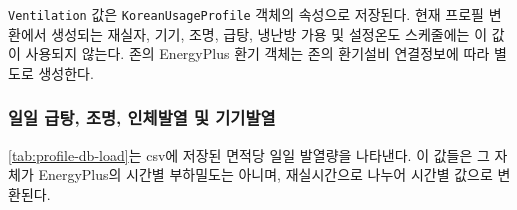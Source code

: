 \begin{defaulttable}
{\begin{tabularx}{\textwidth}{Xccr}
    \bottomrule
  \end{tabularx}
  }
\end{defaulttable}

\texttt{Ventilation} 값은
\texttt{KoreanUsageProfile} 객체의 속성으로 저장된다. 현재 프로필 변환에서 생성되는 재실자, 기기, 조명, 급탕, 냉난방 가용 및 설정온도 스케줄에는 이 값이 사용되지 않는다. 존의 EnergyPlus 환기 객체는 존의 환기설비 연결정보에 따라 별도로 생성한다.

\subsubsection{일일 급탕, 조명, 인체발열 및 기기발열}

\cref{tab:profile-db-load}는 csv에 저장된 면적당 일일 발열량을 나타낸다. 이 값들은 그 자체가 EnergyPlus의 시간별 부하밀도는 아니며, 재실시간으로 나누어 시간별 값으로 변환된다.

